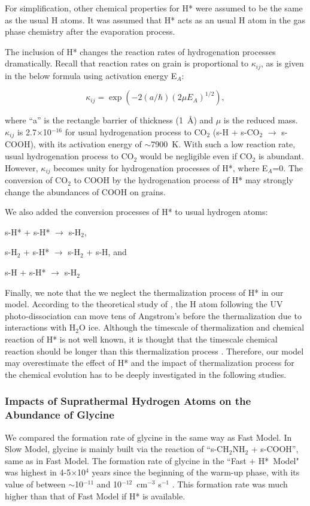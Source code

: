 \documentclass{aastex61}
\begin{document}
For simplification, other chemical properties for H* were assumed to be the same as the usual H atoms.
%
It was assumed that H* acts as an usual H atom in the gas phase chemistry after the evaporation process.


The inclusion of H* changes the reaction rates of hydrogenation processes dramatically.
%
Recall that reaction rates on grain is proportional to $\kappa_{ij}$, as is given in the below formula using activation energy E$_A$:

\begin{equation}
\kappa_{ij}=\exp(-2(a/\hbar)(2\mu E_A)^{1/2}),
\end{equation}

where ``a'' is the rectangle barrier of thickness (1~\AA) and $\mu$ is the reduced mass.
%
$\kappa_{ij}$ is 2.7$\times$10$^{-16}$ for usual hydrogenation process to CO$_2$ (s-H + s-CO$_2$ $\longrightarrow$ s-COOH), with its activation energy of $\sim$7900~K.
%
With such a low reaction rate, usual hydrogenation process to CO$_2$ would be negligible even if CO$_2$ is abundant.
%
However, $\kappa_{ij}$ becomes unity for hydrogenation processes of H*, where E$_A$=0.
%
The conversion of CO$_2$ to COOH by the hydrogenation process of H* may strongly change the abundances of COOH on grains.

We also added the conversion processes of H* to usual hydrogen atoms:

s-H* + s-H* $\longrightarrow$ s-H$_2$,

s-H$_2$ + s-H* $\longrightarrow$ s-H$_2$ + s-H, and

s-H + s-H* $\longrightarrow$ s-H$_2$


Finally, we note that the we neglect the thermalization process of H* in our model.
%
According to the theoretical study of \cite{Andersson08}, the H atom following the UV photo-dissociation can move tens of Angstrom's before the thermalization due to interactions with H$_2$O ice.
%
Although the timescale of thermalization and chemical reaction of H* is not well known, it is thought that the timescale chemical reaction should be longer than this thermalization process \citep{Cuppen17}.
%
Therefore, our model may overestimate the effect of H* and the impact of thermalization process for the chemical evolution has to be deeply investigated in the following studies.


\subsubsection{Impacts of Suprathermal Hydrogen Atoms on the Abundance of Glycine}
We compared the formation rate of glycine in the same way as Fast Model.
%
In Slow Model, glycine is mainly built via the reaction of ``s-CH$_2$NH$_2$ + s-COOH'', same as in Fast Model.
%
The formation rate of glycine in the ``Fast + H*~Model" was highest in 4-5$\times$10$^{4}$ years since the beginning of the warm-up phase, with its value of between $\sim$10$^{-11}$ and 10$^{-12}$~cm$^{-3}$ s$^{-1}$ .
%
This formation rate was much higher than that of Fast Model if H* is available.
\end{document}
